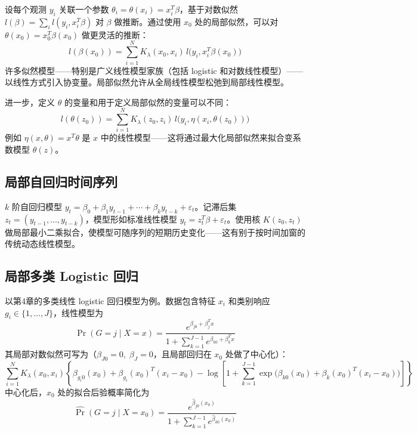 设每个观测 $y_i$ 关联一个参数 $\theta_i = \theta(x_i) = x_i^T \beta$，基于对数似然 $l(\beta) = \sum_i l(y_i, x_i^T \beta)$ 对 $\beta$ 做推断。通过使用 $x_0$ 处的局部似然，可以对 $\theta(x_0) = x_0^T \beta(x_0)$ 做更灵活的推断：
\begin{equation}\label{eq:local_likelihood}
    l(\beta(x_0)) = \sum_{i=1}^{N} K_\lambda(x_0, x_i) \, l\bigl(y_i, x_i^T \beta(x_0)\bigr)
\end{equation}
许多似然模型——特别是广义线性模型家族（包括 logistic 和对数线性模型）——以线性方式引入协变量。局部似然允许从全局线性模型松弛到局部线性模型。

进一步，定义 $\theta$ 的变量和用于定义局部似然的变量可以不同：
\begin{equation}
    l(\theta(z_0)) = \sum_{i=1}^{N} K_\lambda(z_0, z_i) \, l\bigl(y_i, \eta(x_i, \theta(z_0))\bigr)
\end{equation}
例如 $\eta(x, \theta) = x^T \theta$ 是 $x$ 中的线性模型——这将通过最大化局部似然来拟合变系数模型 $\theta(z)$。

\subsection{局部自回归时间序列}

$k$ 阶自回归模型 $y_t = \beta_0 + \beta_1 y_{t-1} + \cdots + \beta_k y_{t-k} + \varepsilon_t$。记滞后集 $z_t = (y_{t-1}, \ldots, y_{t-k})$，模型形如标准线性模型 $y_t = z_t^T \beta + \varepsilon_t$。使用核 $K(z_0, z_t)$ 做局部最小二乘拟合，使模型可随序列的短期历史变化——这有别于按时间加窗的传统动态线性模型。

\subsection{局部多类 Logistic 回归}

以第4章的多类线性 logistic 回归模型为例。数据包含特征 $x_i$ 和类别响应 $g_i \in \{1, \ldots, J\}$，线性模型为
\begin{equation}\label{eq:multiclass_logistic}
    \Pr(G = j \mid X = x) = \frac{e^{\beta_{j0} + \beta_j^T x}}{1 + \sum_{k=1}^{J-1} e^{\beta_{k0} + \beta_k^T x}}
\end{equation}
其局部对数似然可写为（$\beta_{J0}=0,\; \beta_J=0$，且局部回归在 $x_0$ 处做了中心化）：
\begin{equation}\label{eq:local_multiclass}
    \sum_{i=1}^{N} K_\lambda(x_0, x_i) \left\{ \beta_{g_i 0}(x_0) + \beta_{g_i}(x_0)^T (x_i - x_0) - \log\!\left[1 + \sum_{k=1}^{J-1} \exp\!\bigl(\beta_{k0}(x_0) + \beta_k(x_0)^T (x_i - x_0)\bigr)\right] \right\}
\end{equation}
中心化后，$x_0$ 处的拟合后验概率简化为
\begin{equation}\label{eq:local_posterior}
    \widehat{\Pr}(G = j \mid X = x_0) = \frac{e^{\hat{\beta}_{j0}(x_0)}}{1 + \sum_{k=1}^{J-1} e^{\hat{\beta}_{k0}(x_0)}}
\end{equation}

